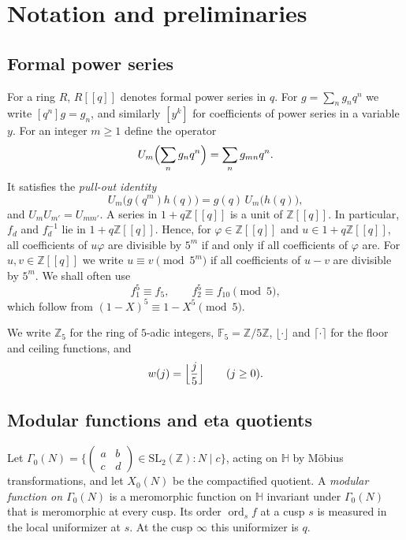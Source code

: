 \documentclass[11pt]{article}
\theoremstyle{definition}
\theoremstyle{remark}
\numberwithin{equation}{section}
\newcommand{\ord}{\operatorname{ord}}
\newcommand{\Z}{\mathbb{Z}}
\newcommand{\F}{\mathbb{F}}
\newcommand{\HH}{\mathbb{H}}
\begin{document}
\section{Notation and preliminaries}\label{sec:prelim}

\subsection{Formal power series}
For a ring $R$, $R[[q]]$ denotes formal power series in $q$. For $g=\sum_ng_nq^n$ we write $[q^n]g=g_n$, and similarly $[y^k]$ for coefficients of power series in a variable $y$. For an integer $m\ge1$ define the operator
\[
U_m\Bigl(\sum_{n}g_nq^n\Bigr)=\sum_ng_{mn}q^n.
\]
It satisfies the \emph{pull-out identity}
\begin{equation}\label{eq:pullout}
U_m\bigl(g(q^m)h(q)\bigr)=g(q)\,U_m\bigl(h(q)\bigr),
\end{equation}
and $U_mU_{m'}=U_{mm'}$. A series in $1+q\Z[[q]]$ is a unit of $\Z[[q]]$. In particular, $f_d$ and $f_d^{-1}$ lie in $1+q\Z[[q]]$. Hence, for $\varphi\in\Z[[q]]$ and $u\in1+q\Z[[q]]$, all coefficients of $u\varphi$ are divisible by $5^m$ if and only if all coefficients of $\varphi$ are. For $u,v\in\Z[[q]]$ we write $u\equiv v\pmod{5^m}$ if all coefficients of $u-v$ are divisible by $5^m$. We shall often use
\begin{equation}\label{eq:frob}
f_1^5\equiv f_5,\qquad f_2^5\equiv f_{10}\pmod5,
\end{equation}
which follow from $(1-X)^5\equiv1-X^5\pmod5$.

We write $\Z_5$ for the ring of $5$-adic integers, $\F_5=\Z/5\Z$, $\lfloor\cdot\rfloor$ and $\lceil\cdot\rceil$ for the floor and ceiling functions, and
\[
w(j)=\Bigl\lfloor\frac j5\Bigr\rfloor\qquad(j\ge0).
\]

\subsection{Modular functions and eta quotients}
Let $\Gamma_0(N)=\{\left(\begin{smallmatrix}a&b\\c&d\end{smallmatrix}\right)\in\mathrm{SL}_2(\Z):N\mid c\}$, acting on $\HH$ by M\"obius transformations, and let $X_0(N)$ be the compactified quotient. A \emph{modular function on $\Gamma_0(N)$} is a meromorphic function on $\HH$ invariant under $\Gamma_0(N)$ that is meromorphic at every cusp. Its order $\ord_sf$ at a cusp $s$ is measured in the local uniformizer at $s$. At the cusp $\infty$ this uniformizer is $q$.
\end{document}
